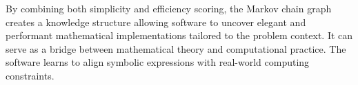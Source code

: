 \documentclass[9pt,a4paper,twocolumn]{article}
\newcounter{theo}
\begin{document}
                By combining both simplicity and efficiency scoring, the Markov chain graph creates a knowledge structure allowing software to uncover elegant and performant mathematical implementations tailored to the problem context. It can serve as a bridge between mathematical theory and computational practice. The software learns to align symbolic expressions with real-world computing constraints.
            
            
           
            
    
    
\end{document}
